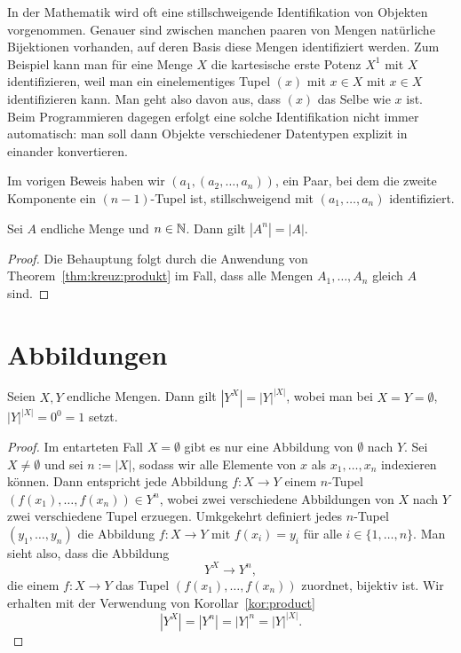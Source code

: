 \begin{bem}
	In der Mathematik wird oft eine stillschweigende Identifikation von Objekten vorgenommen. Genauer sind  zwischen manchen paaren von Mengen natürliche Bijektionen vorhanden, auf deren Basis diese Mengen identifiziert werden. Zum Beispiel kann man für eine Menge $X$ die kartesische erste Potenz $X^1$ mit $X$ identifizieren, weil man ein einelementiges Tupel $(x)$ mit $x \in X$ mit $x \in X$ identifizieren kann. Man geht also davon aus, dass $(x)$ das Selbe wie $x$ ist. Beim Programmieren dagegen erfolgt eine solche Identifikation nicht immer automatisch: man soll dann Objekte verschiedener Datentypen explizit in einander konvertieren. 
	
	Im vorigen Beweis haben wir $(a_1,(a_2,\ldots,a_n))$, ein Paar, bei dem die zweite Komponente ein $(n-1)$-Tupel ist, stillschweigend mit $(a_1,\ldots,a_n)$ identifiziert. 
\end{bem} 

\begin{kor} \label{kor:product} 
	Sei $A$ endliche Menge und $n \in \mathbb{N}$. Dann gilt $|A^n| = |A|$. 
\end{kor}
\begin{proof}
	Die Behauptung folgt durch die Anwendung von Theorem~\ref{thm:kreuz:produkt} im Fall, dass alle Mengen $A_1,\ldots,A_n$ gleich $A$ sind. 
\end{proof}  

\section{Abbildungen} 

\begin{thm}
	Seien $X,Y $ endliche Mengen. Dann gilt $|Y^X| = |Y|^{|X|}$, wobei man bei $X= Y = \emptyset$, $|Y|^{|X|} = 0^0  =1$ setzt. 
\end{thm}
\begin{proof}
	Im entarteten Fall $X = \emptyset$ gibt es nur eine Abbildung von $\emptyset$ nach $Y$. 
	Sei $X \ne\emptyset$ und sei $n := |X|$, sodass wir alle Elemente von $x$ als $x_1,\ldots,x_n$ indexieren können. Dann entspricht jede Abbildung $f : X \to Y$ einem $n$-Tupel $(f(x_1),\ldots,f(x_n)) \in Y^n$, wobei zwei verschiedene Abbildungen von $X$ nach $Y$ zwei verschiedene Tupel erzuegen. 
	Umkgekehrt definiert jedes $n$-Tupel $(y_1,\ldots,y_n)$ die Abbildung $f: X \to Y$ mit $f(x_i)  = y_i$ für alle $i \in \{1,\ldots,n\}$. Man sieht also, dass die Abbildung 
	\[
			Y^X \to Y^n,
	\]
	die einem $f : X \to Y$ das Tupel $(f(x_1),\ldots,f(x_n))$ zuordnet, bijektiv ist. Wir erhalten mit der Verwendung von Korollar~\ref{kor:product}
	\[
			|Y^X| = |Y^n| = |Y|^n = |Y|^{|X|}. 
	\]
\end{proof} 

